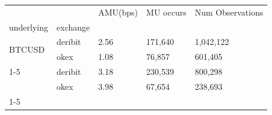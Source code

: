 \begin{tabular}{lllll}
\toprule
 &  & AMU(bps) & MU occurs & Num Observations \\
underlying & exchange &  &  &  \\
\midrule
\multirow[t]{2}{*}{BTCUSD} & deribit & 2.56 & 171,640 & 1,042,122 \\
 & okex & 1.08 & 76,857 & 601,405 \\
\cline{1-5}
\multirow[t]{2}{*}{ETHUSD} & deribit & 3.18 & 230,539 & 800,298 \\
 & okex & 3.98 & 67,654 & 238,693 \\
\cline{1-5}
\bottomrule
\end{tabular}
